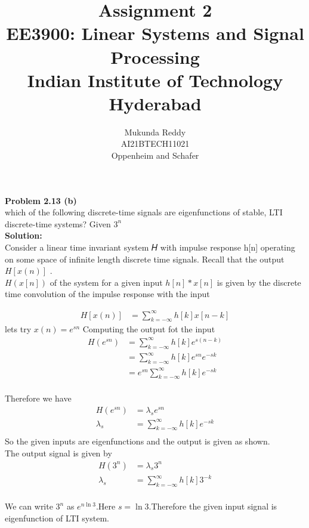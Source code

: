 \documentclass[journal,12pt,twocolumn]{IEEEtran}
\title{Assignment 2 \\ \Large EE3900: Linear Systems and Signal Processing \\ \large Indian Institute of Technology Hyderabad}
\author{Mukunda Reddy \\ \normalsize AI21BTECH11021  \\ \large Oppenheim and Schafer}
\newcommand{\solution}{\noindent \textbf{Solution: }}
\begin{document}
	\maketitle
	
	\textbf{Problem 2.13 (b)} \\
       which of the following discrete-time signals
        are eigenfunctions of stable, 
        LTI discrete-time systems? 
        Given $3^{n}$
        \\
    \solution\\
    Consider a linear time invariant system 𝐻
 with impulse response h[n] operating on some space of infinite length discrete time signals. Recall that the output $H[x(n)]$ . \\
$H(x[n])$ of the system for a given input $h[n]*x[n]$
 is given by the discrete time convolution of the impulse response with the input
 
 \begin{align*}
 H[x(n)] &= \sum^{\infty} _{k = -\infty} h[k]x[n-k]  
 \end{align*}
 lets try $x(n) = e^{sn}$ Computing the output fot the input
 \begin{align*}
 H(e^{sn}) &= \sum^{\infty} _{k = -\infty} h[k]e^{s(n-k)} \\
 &= \sum^{\infty} _{k = -\infty} h[k]e^{sn} e^{-sk} \\
 &= e^{sn} \sum^{\infty} _{k = -\infty} h[k]e^{-sk} \\ 
 \end{align*}
 
 Therefore we have 
 \begin{align*}
 H(e^{sn}) &= \lambda_s e^{sn} \\
 \lambda_s &= \sum^{\infty} _{k = -\infty} h[k]e^{-sk} \\
 \end{align*}
So the given inputs are eigenfunctions  and the output is given as shown.\\
 

The output signal is given by 
\begin{align*}
 H(3^{n}) &= \lambda_s 3^{n} \\
 \lambda_s &= \sum^{\infty} _{k = -\infty} h[k]3^{-k} \\
 \end{align*}
 
 We can write $3^{n}$ as $e^{n\ln 3}$.Here $s = \ln 3$.Therefore the given input signal is eigenfunction of LTI system.\\
\end{document}
